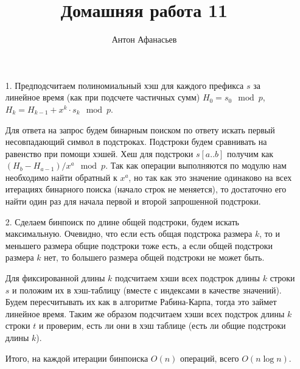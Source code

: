 \documentclass[10pt]{article}
\begin{document}
\title{Домашняя работа 11}
\author{Антон Афанасьев}
\maketitle

\begin{enumerate}
	\item[1.] Предподсчитаем полиномиальный хэш для каждого префикса $s$ за линейное время (как при подсчете частичных сумм) $H_0 = s_0 \mod p$, $H_k = H_{k-1} + x^k \cdot s_k \mod p$.
	
	Для ответа на запрос будем бинарным поиском по ответу искать первый несовпадающий символ в подстроках. Подстроки будем сравнивать на равенство при помощи хэшей. Хеш для подстроки $s[a..b]$ получим как $(H_b - H_{a-1}) / x^{a} \mod p$. Так как операции выполняются по модулю нам необходимо найти обратный к $x^a$, но так как это значение одинаково на всех итерациях бинарного поиска (начало строк не меняется), то достаточно его найти один раз для начала первой и второй запрошенной подстроки.
	
	 \item[2.] Сделаем бинпоиск по длине общей подстроки, будем искать максимальную. Очевидно, что если есть общая подстрока размера $k$, то и меньшего размера общие подстроки тоже есть, а если общей подстроки размера $k$ нет, то большего размера общей подстроки не может быть.
	 
	 Для фиксированной длины $k$ подсчитаем хэши всех подстрок длины $k$ строки $s$ и положим их в хэш-таблицу (вместе с индексами в качестве значений). Будем пересчитывать их как в алгоритме Рабина-Карпа, тогда это займет линейное время. Таким же образом подсчитаем хэши всех подстрок длины $k$ строки $t$ и проверим, есть ли они в хэш таблице (есть ли общие подстроки длины $k$).
	 
	 Итого, на каждой итерации бинпоиска $O(n)$ операций, всего $O(n \log n)$.
	
		
\end{enumerate}
\end{document}
